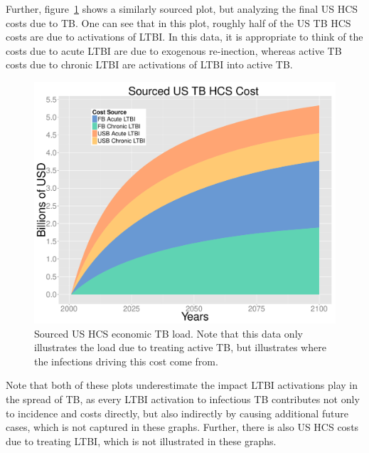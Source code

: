 \documentclass{amsart}
\begin{document}
Further, figure~\ref{fig:costPlotSourced} shows a similarly sourced plot, but analyzing the
final US HCS costs due to TB. One can see that in this plot, roughly half of the
US TB HCS costs are due to activations of LTBI. In this data, it is appropriate
to think of the costs due to acute LTBI are due to exogenous re-inection,
whereas active TB costs due to chronic LTBI are activations of LTBI into active
TB. 
\begin{figure}[h]
  \begin{center}
    \includegraphics[scale=.35]{costPlotSourced}
  \end{center}
  \caption{Sourced US HCS economic TB load. Note that this data only illustrates
    the load due to treating active TB, but illustrates where the infections
    driving this cost come from.}
  \label{fig:costPlotSourced}
\end{figure}
Note that both of these plots underestimate the impact LTBI activations play in
the spread of TB, as every LTBI activation to infectious TB contributes not only
to incidence and costs directly, but also indirectly by causing additional
future cases, which is not captured in these graphs. Further, there is also US
HCS costs due to treating LTBI, which is not illustrated in these graphs. 
\end{document}
